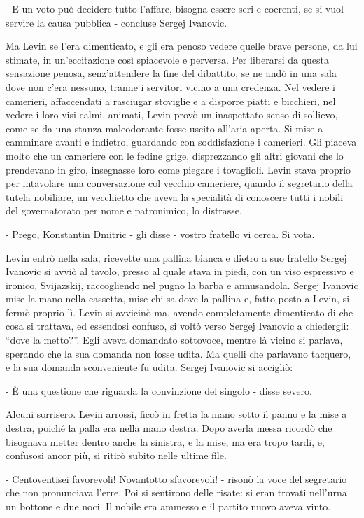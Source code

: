 - E un voto può decidere tutto l'affare, bisogna essere seri e coerenti, se si vuol servire la causa pubblica - concluse Sergej Ivanovic. 

Ma Levin se l'era dimenticato, e gli era penoso vedere quelle brave persone, da lui stimate, in un'eccitazione così spiacevole e perversa. Per liberarsi da questa sensazione penosa, senz'attendere la fine del dibattito, se ne andò in una sala dove non c'era nessuno, tranne i servitori vicino a una credenza. Nel vedere i camerieri, affaccendati a rasciugar stoviglie e a disporre piatti e bicchieri, nel vedere i loro visi calmi, animati, Levin provò un inaspettato senso di sollievo, come se da una stanza maleodorante fosse uscito all'aria aperta. Si mise a camminare avanti e indietro, guardando con soddisfazione i camerieri. Gli piaceva molto che un cameriere con le fedine grige, disprezzando gli altri giovani che lo prendevano in giro, insegnasse loro come piegare i tovaglioli. Levin stava proprio per intavolare una conversazione col vecchio cameriere, quando il segretario della tutela nobiliare, un vecchietto che aveva la specialità di conoscere tutti i nobili del governatorato per nome e patronimico, lo distrasse. 

- Prego, Konstantin Dmitric - gli disse - vostro fratello vi cerca. Si vota. 

Levin entrò nella sala, ricevette una pallina bianca e dietro a suo fratello Sergej Ivanovic si avviò al tavolo, presso al quale stava in piedi, con un viso espressivo e ironico, Svijazskij, raccogliendo nel pugno la barba e annusandola. Sergej Ivanovic mise la mano nella cassetta, mise chi sa dove la pallina e, fatto posto a Levin, si fermò proprio lì. Levin si avvicinò ma, avendo completamente dimenticato di che cosa si trattava, ed essendosi confuso, si voltò verso Sergej Ivanovic a chiedergli: ``dove la metto?''. Egli aveva domandato sottovoce, mentre là vicino si parlava, sperando che la sua domanda non fosse udita. Ma quelli che parlavano tacquero, e la sua domanda sconveniente fu udita. Sergej Ivanovic si accigliò: 

- È una questione che riguarda la convinzione del singolo - disse severo. 

Alcuni sorrisero. Levin arrossì, ficcò in fretta la mano sotto il panno e la mise a destra, poiché la palla era nella mano destra. Dopo averla messa ricordò che bisognava metter dentro anche la sinistra, e la mise, ma era tropo tardi, e, confusosi ancor più, si ritirò subito nelle ultime file. 

- Centoventisei favorevoli! Novantotto sfavorevoli! - risonò la voce del segretario che non pronunciava l'erre. Poi si sentirono delle risate: si eran trovati nell'urna un bottone e due noci. Il nobile era ammesso e il partito nuovo aveva vinto. 

